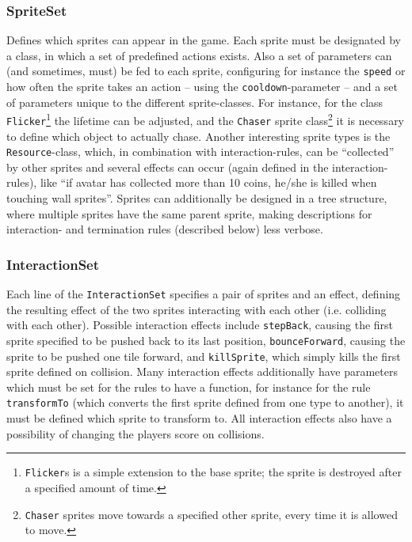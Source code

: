 \documentclass[a4paper,titlepage,final]{report}
\begin{document}
\subsubsection*{SpriteSet}
Defines which sprites can appear in the game. Each sprite must be designated by a class, in which a set of predefined actions exists. Also a set of parameters can (and sometimes, must) be fed to each sprite, configuring for instance the \texttt{speed} or how often the sprite takes an action -- using the \texttt{cooldown}-parameter -- and a set of parameters unique to the different sprite-classes.
For instance, for the  class \texttt{Flicker}\footnote{\texttt{Flicker}s is a simple extension to the base sprite; the sprite is destroyed after a specified amount of time.} the lifetime can be adjusted, and the \texttt{Chaser} sprite class\footnote{\texttt{Chaser} sprites move towards a specified other sprite, every time it is allowed to move.} it is necessary to define which object to actually chase.
Another interesting sprite types is the \texttt{Resource}-class, which, in combination with interaction-rules, can be ``collected'' by other sprites and several effects can occur (again defined in the interaction-rules), like ``if avatar has collected more than 10 coins, he/she is killed when touching wall sprites''.
Sprites can additionally be designed in a tree structure, where multiple sprites have the same parent sprite, making descriptions for interaction- and termination rules (described below) less verbose. 

\subsubsection*{InteractionSet}
Each line of the \texttt{InteractionSet} specifies a pair of sprites and an effect, defining the resulting effect of the two sprites interacting with each other (i.e. colliding with each other).
Possible interaction effects include \texttt{stepBack}, causing the first sprite specified to be pushed back to its last position, \texttt{bounceForward}, causing the sprite to be pushed one tile forward, and \texttt{killSprite}, which simply kills the first sprite defined on collision.
Many interaction effects additionally have parameters which must be set for the rules to have a function, for instance for the rule \texttt{transformTo} (which converts the first sprite defined from one type to another), it must be defined which sprite to transform to.
All interaction effects also have a possibility of changing the players score on collisions.
\end{document}

